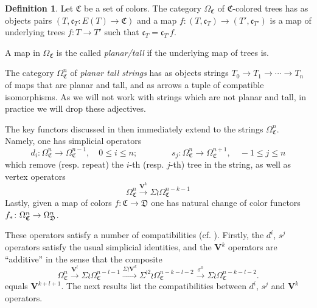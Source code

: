 \documentclass[a4paper,10pt
,draft
]{article}%
\numberwithin{equation}{section}
\numberwithin{figure}{section}
\theoremstyle{definition} %
\newtheorem{definition}[equation]{Definition}%
\newcommand{\1}{\ensuremath{\mathbbm 1}}%
\begin{document}
\begin{definition}
Let $\mathfrak{C}$ be a set of colors.
The category $\Omega_{\mathfrak{C}}$ of $\mathfrak{C}$-colored trees has as objects pairs
$(T,\mathfrak{c}_T\colon E(T) \to \mathfrak{C})$ and a map
$f\colon (T,\mathfrak{c}_T) \to (T',\mathfrak{c}_{T'})$
is a map of underlying trees $f\colon T \to T'$
such that $\mathfrak{c}_T = \mathfrak{c}_{T'} f$.

A map in $\Omega_{\mathfrak{C}}$ is the called \textit{planar/tall} if the underlying map of trees is.

The category $\Omega_{\mathfrak{C}}^n$ of \textit{planar tall strings} has as objects strings $T_0 \to T_1 \to \cdots \to T_n$ of maps that are planar and tall, and as arrows a tuple of compatible isomorphisms.
As we will not work with strings which are not planar and tall, in practice we will drop these adjectives.
\end{definition}


The key functors discussed in \cite[\S 3.4]{BP_geo} then immediately extend to the strings
$\Omega_{\mathfrak{C}}^n$. Namely, one has simplicial operators
\[
d_i \colon \Omega_{\mathfrak{C}}^n \to \Omega_{\mathfrak{C}}^{n-1},
\quad 0 \leq i \leq n;
\qquad \qquad
s_j \colon \Omega_{\mathfrak{C}}^{n} \to \Omega_{\mathfrak{C}}^{n+1},
\quad -1 \leq j \leq n
\]
which remove (resp. repeat) the $i$-th (resp. $j$-th) tree in the string,
as well as vertex operators
\[
\Omega^{n}_{\mathfrak{C}}
\xrightarrow{\boldsymbol{V}^k}
\Sigma \wr \Omega^{n-k-1}_{\mathfrak{C}}
\]
Lastly, given a map of colors 
$f \colon \mathfrak{C} \to \mathfrak{D}$
one has natural change of color functors
$f_{\**} \colon \Omega^n_{\mathfrak{C}} \to \Omega^n_{\mathfrak{D}}$.



These operators satisfy a number of compatibilities (cf. \cite[Prop. 3.90]{BP_geo}). Firstly, the $d^i$, $s^j$ operators satisfy the usual simplicial identities, 
and the $\boldsymbol{V}^k$ operators are ``additive'' in the sense that
the composite
\begin{equation}\label{VKADD EQ}
	\Omega^{n}_{\mathfrak{C}} \xrightarrow{\boldsymbol{V}^l} 
	\Sigma \wr \Omega^{n-l-1}_{\mathfrak{C}} \xrightarrow{\Sigma \wr \boldsymbol{V}^k}
	\Sigma^{\wr 2} \wr \Omega^{n-k-l-2}_{\mathfrak{C}} \xrightarrow{\sigma^0}
	\Sigma \wr \Omega^{n-k-l-2}_{\mathfrak{C}}.
\end{equation}
equals $\boldsymbol{V}^{k+l+1}$.
The next results list the compatibilities between $d^i$, $s^j$ and $\boldsymbol{V}^k$ operators.
\end{document}
